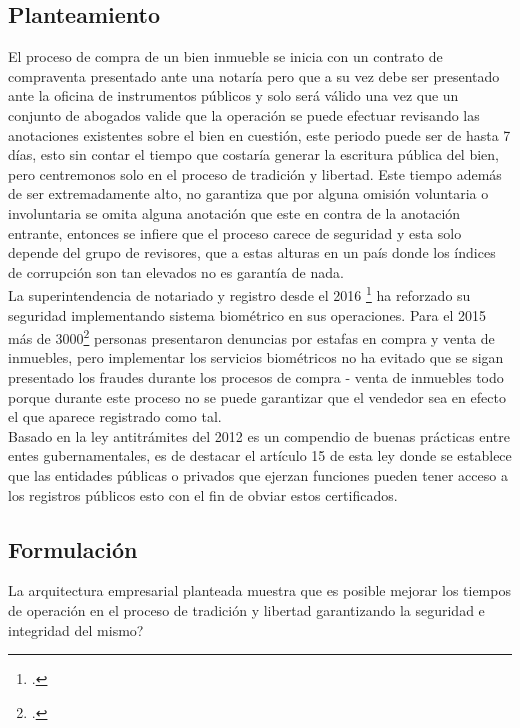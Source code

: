\subsection{Planteamiento}

El proceso de compra de un bien inmueble se inicia con un contrato de compraventa presentado ante una notaría pero que a su vez debe ser presentado ante la oficina de instrumentos públicos y solo será válido una vez que un conjunto de abogados valide que la operación se puede efectuar revisando las anotaciones existentes sobre el bien en cuestión, este periodo puede ser de hasta 7 días, esto sin contar el tiempo que costaría generar la escritura pública del bien, pero centremonos solo en el proceso de tradición y libertad. Este tiempo además de ser extremadamente alto, no garantiza que por alguna omisión voluntaria o involuntaria se omita alguna anotación que este en contra de la anotación entrante, entonces se infiere que el proceso carece de seguridad y esta solo depende del grupo de revisores, que a estas alturas en un país donde los índices de corrupción son tan elevados no es garantía de nada. 
\\
 La superintendencia de notariado y registro desde el 2016 \footcite{https://colombiadigital.net/opinion/columnistas/certicamara/item/9423-compra-de-inmuebles-biometria-para-no-convertirse-en-victima-de-fraude.html} ha reforzado su seguridad implementando sistema biométrico en sus operaciones. Para el 2015 más de 3000\footcite{https://www.las2orillas.co/el-cartel-de-escrituradores-las-estafas-de-compra-venta-de-predios} personas presentaron denuncias por estafas en compra y venta de inmuebles, pero implementar los servicios biométricos no ha evitado que se sigan presentado los fraudes durante los procesos de compra - venta de inmuebles todo porque durante este proceso no se puede garantizar que el vendedor sea en efecto el que aparece registrado como tal.
 \\
Basado en la ley antitrámites del 2012 es un compendio de buenas prácticas entre entes gubernamentales, es de destacar el artículo 15 de esta ley donde se establece que las entidades públicas o privados que ejerzan funciones pueden tener acceso a los registros públicos esto con el fin de obviar estos certificados.


\subsection{Formulación}
La arquitectura empresarial planteada muestra que es posible mejorar los tiempos de operación en el proceso de tradición y libertad garantizando la seguridad e integridad del mismo?

